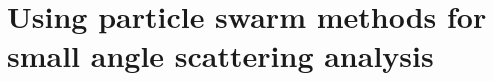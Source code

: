 
\chapter{Using particle swarm methods for small angle scattering analysis} %

\label{smallangle} %




\pagebreak




